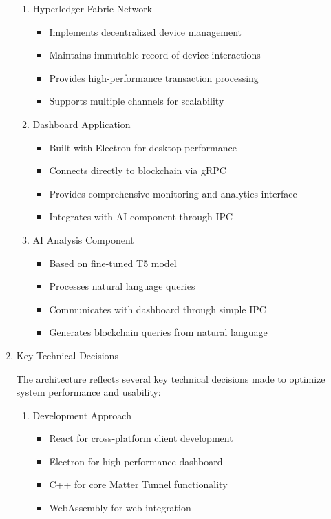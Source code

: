 \documentclass[conference]{IEEEtran}
\begin{document}
\begin{enumerate}[itemsep=2ex, parsep=1ex]
\begin{enumerate}
		\item Hyperledger Fabric Network
		      \begin{itemize}[itemsep=0.5pt, parsep=0.5pt]
		      	\item Implements decentralized device management
		      	\item Maintains immutable record of device interactions
		      	\item Provides high-performance transaction processing
		      	\item Supports multiple channels for scalability
		      \end{itemize}
		      		      
		\item Dashboard Application
		      \begin{itemize}[itemsep=0.5pt, parsep=0.5pt]
		      	\item Built with Electron for desktop performance
		      	\item Connects directly to blockchain via gRPC
		      	\item Provides comprehensive monitoring and analytics interface
		      	\item Integrates with AI component through IPC
		      \end{itemize}
		      		      
		\item AI Analysis Component
		      \begin{itemize}[itemsep=0.5pt, parsep=0.5pt]
		      	\item Based on fine-tuned T5 model
		      	\item Processes natural language queries
		      	\item Communicates with dashboard through simple IPC
		      	\item Generates blockchain queries from natural language
		      \end{itemize}
	\end{enumerate}
		
	\item{Key Technical Decisions}
		
	The architecture reflects several key technical decisions made to optimize system performance and usability:
		
	\begin{enumerate}
		\item Development Approach
		      \begin{itemize}[itemsep=0.5pt, parsep=0.5pt]
		      	\item React for cross-platform client development
		      	\item Electron for high-performance dashboard
		      	\item C++ for core Matter Tunnel functionality
		      	\item WebAssembly for web integration
		      \end{itemize}
		      		      

\end{enumerate}
\end{enumerate}
\end{document}
